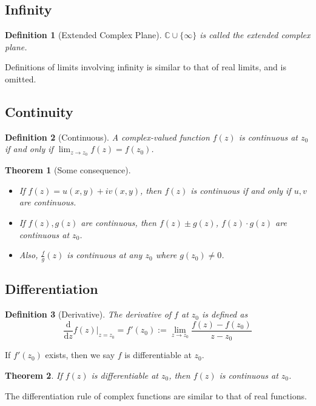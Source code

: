 \documentclass[12pt]{article}
\newcommand{\diff}{\mathrm{d}}
\newtheorem{definition}{Definition}[section]
\newtheorem{theorem}{Theorem}[section]
\theoremstyle{definition}
\begin{document}
\subsection{Infinity}
\begin{definition}[Extended Complex Plane]
\normalfont $\mathbb{C}\cup\{\infty\}$ is called the extended complex plane.
\end{definition}
Definitions of limits involving infinity is similar to that of real limits, and is omitted.
\subsection{Continuity}
\begin{definition}[Continuous]
\normalfont A complex-valued function $f(z)$ is continuous at $z_0$ if and only if $\lim_{z\to z_0}f(z) = f(z_0)$.
\end{definition}
\begin{theorem}[Some consequence]
\normalfont 
\begin{itemize}
	\item If $f(z)=u(x,y)+iv(x,y)$, then $f(z)$ is continuous if and only if $u,v$ are continuous.
	\item If $f(z), g(z)$ are continuous, then $f(z)\pm g(z)$, $f(z)\cdot g(z)$ are continuous at $z_0$.
	\item Also, $\frac{f}{g}(z)$ is continuous at any $z_0$ where $g(z_0)\neq 0$.
\end{itemize}
\end{theorem}
\subsection{Differentiation}
\begin{definition}[Derivative]
\normalfont The derivative of $f$ at $z_0$ is defined as
\[
\frac{\diff}{\diff z}f(z)|_{z=z_0} = f'(z_0):=\lim_{z\to z_0}\frac{f(z)-f(z_0)}{z-z_0}
\]
\end{definition}
If $f'(z_0)$ exists, then we say $f$ is differentiable at $z_0$.
\begin{theorem}\normalfont If $f(z)$ is differentiable at $z_0$, then $f(z)$ is continuous at $z_0$.
\end{theorem}
The differentiation rule of complex functions are similar to that of real functions.
\end{document}

